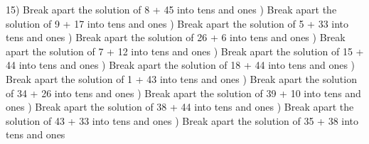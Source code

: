 \documentclass{article}%
\begin{document}
15) Break apart the solution of 8 + 45 into tens and ones%
\newline%
\newline%
) Break apart the solution of 9 + 17 into tens and ones%
\newline%
\newline%
) Break apart the solution of 5 + 33 into tens and ones%
\newline%
\newline%
) Break apart the solution of 26 + 6 into tens and ones%
\newline%
\newline%
) Break apart the solution of 7 + 12 into tens and ones%
\newline%
\newline%
) Break apart the solution of 15 + 44 into tens and ones%
\newline%
\newline%
) Break apart the solution of 18 + 44 into tens and ones%
\newline%
\newline%
) Break apart the solution of 1 + 43 into tens and ones%
\newline%
\newline%
) Break apart the solution of 34 + 26 into tens and ones%
\newline%
\newline%
) Break apart the solution of 39 + 10 into tens and ones%
\newline%
\newline%
) Break apart the solution of 38 + 44 into tens and ones%
\newline%
\newline%
) Break apart the solution of 43 + 33 into tens and ones%
\newline%
\newline%
) Break apart the solution of 35 + 38 into tens and ones%
\newline%
\end{document}
